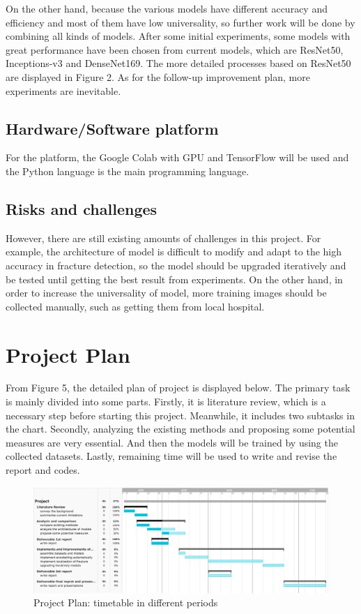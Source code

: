 \documentclass[12pt,oneside,a4paper]{article}
\begin{document}
\par On the other hand, because the various models have different accuracy and efficiency and most of them have low universality, so further work will be done by combining all kinds of models. After some initial experiments, some models with great performance have been chosen from current models, which are ResNet50, Inceptions-v3 and DenseNet169. The more detailed processes based on ResNet50 are displayed in Figure 2. As for the follow-up improvement plan, more experiments are inevitable. 



\subsection{Hardware/Software platform}
For the platform, the Google Colab with GPU and TensorFlow will be used and the Python language is the main programming language. 
\subsection{Risks and challenges}
However, there are still existing amounts of challenges in this project. For example, the architecture of model is difficult to modify and adapt to the high accuracy in fracture detection, so the model should be upgraded iteratively and be tested until getting the best result from experiments. On the other hand, in order to increase the universality of model, more training images should be collected manually, such as getting them from local hospital.


\clearpage
\section{Project Plan}
From Figure 5, the detailed plan of project is displayed below. The primary task is mainly divided into some parts. Firstly, it is literature review, which is a necessary step before starting this project. Meanwhile, it includes two subtasks in the chart. Secondly, analyzing the existing methods and proposing some potential measures are very essential. And then the models will be trained by using the collected datasets. Lastly, remaining time will be used to write and revise the report and codes.

\begin{figure}
\begin{center}
\includegraphics[width=1\columnwidth]{images/TaskGantt.png}
\caption{Project Plan: timetable in different periods}
\end{center}
\end{figure}
\end{document}
